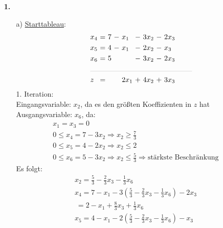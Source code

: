 \documentclass [a4paper,11pt]{article}
\author{\authorinfotitle}
\title{\titleinfo}
\date{\today}
\begin{document}
\maketitle
    \begin{enumerate}
        \item[\textbf{1.}]
            \begin{enumerate}
            \item[a)]
                \underline{Starttableau}:
                \begin{align*}
                \begin{alignedat}{6}
                & x_4 &\ = &\ 7 &\ - &\ x_1 &\ - &\ 3x_2 &\ - &\ 2x_3 \\
                & x_5 &\ = &\ 4 &\ - &\ x_1 &\ - &\ 2x_2 &\ - &\  x_3 \\
                & x_6 &\ = &\ 5 &    &      &\ - &\ 3x_2 &\ - &\ 2x_3 \\
                &\rlap{\rule{5cm}{.1pt}} &&&&&&&&\\
                & z   &\ = &    &    &\ 2x_1 &\ + &\  4x_2 &\ + &\ 3x_3 
                \end{alignedat}
                \end{align*}
                1. Iteration:\\
                Eingangsvariable: $x_2$, da es den größten Koeffizienten in $z$ hat\\
                Ausgangsvariable: $x_6$, da:
                \begin{align*}
                    &x_1 = x_3 = 0\\
                    & 0 \leq x_4 = 7 - 3x_2 \Rightarrow x_2 \geq \frac{7}{3}\\
                    & 0 \leq x_5 = 4 - 2x_2 \Rightarrow x_2 \leq 2\\
                    & 0 \leq x_6 = 5 - 3x_2 \Rightarrow x_2 \leq \frac{5}{3} \Rightarrow \text{stärkste Beschränkung}
                \end{align*}
                Es folgt:
                \begin{align*}
                    & x_2  = \frac{5}{3} - \frac{2}{3} x_3 -\frac{1}{3} x_6\\
                    & x_4  = 7 - x_1 - 3\left( \frac{5}{3} - \frac{2}{3} x_3 -\frac{1}{3} x_6 \right) - 2x_3\\
                    &    \ = 2 - x_1 + \frac{8}{3}x_3 + \frac{1}{3} x_6\\
                    & x_5  = 4 - x_1 - 2\left( \frac{5}{3} - \frac{2}{3} x_3 -\frac{1}{3} x_6 \right) - x_3\\

\end{align*}
\end{enumerate}
\end{enumerate}
\end{document}
